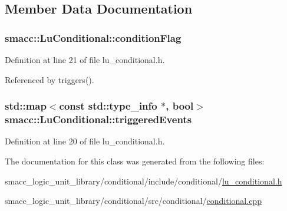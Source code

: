 \subsection{Member Data Documentation}
\subsubsection[{\texorpdfstring{condition\+Flag}{conditionFlag}}]{ smacc\+::\+Lu\+Conditional\+::condition\+Flag\hspace{0.3cm}{\ttfamily [private]}}\hypertarget{classsmacc_1_1LuConditional_aa4ba603a8ae5544b298ec6254c103b56}{}\label{classsmacc_1_1LuConditional_aa4ba603a8ae5544b298ec6254c103b56}


Definition at line 21 of file lu\+\_\+conditional.\+h.



Referenced by triggers().

\subsubsection[{\texorpdfstring{triggered\+Events}{triggeredEvents}}]{\setlength{\rightskip}{0pt plus 5cm}std\+::map$<$const std\+::type\+\_\+info $\ast$, {\bf bool}$>$ smacc\+::\+Lu\+Conditional\+::triggered\+Events\hspace{0.3cm}{\ttfamily [private]}}\hypertarget{classsmacc_1_1LuConditional_a0bc63c3144980b6ae65c91a6722ec87e}{}\label{classsmacc_1_1LuConditional_a0bc63c3144980b6ae65c91a6722ec87e}


Definition at line 20 of file lu\+\_\+conditional.\+h.



The documentation for this class was generated from the following files\+:\begin{DoxyCompactItemize}
\item 
smacc\+\_\+logic\+\_\+unit\+\_\+library/conditional/include/conditional/\hyperlink{lu__conditional_8h}{lu\+\_\+conditional.\+h}\item 
smacc\+\_\+logic\+\_\+unit\+\_\+library/conditional/src/conditional/\hyperlink{conditional_8cpp}{conditional.\+cpp}\end{DoxyCompactItemize}

